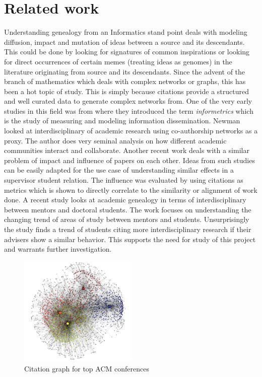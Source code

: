 \documentclass[a4paper]{article}
\begin{document}
\section{Related work}
Understanding genealogy from an Informatics stand point deals with modeling diffusion, impact and mutation of ideas between a source and its descendants. This could be done by looking for signatures of common inspirations or looking for direct occurrences of certain memes (treating ideas as genomes) in the literature originating from source and its descendants. Since the advent of the branch of mathematics which deals with complex networks or graphs, this has been a hot topic of study. This is simply because citations provide a structured and well curated data to generate complex networks from. One of the very early studies in this field was from \cite{egghe1990introduction} where they introduced the term \textit{informetrics} which is the study of measuring and modeling information dissemination. Newman \cite{newman2004coauthorship} looked at interdisciplinary of academic research using co-authorship networks as a proxy. The author does very seminal analysis on how different academic communities interact and collaborate. Another recent work \cite{dietz2007unsupervised} deals with a similar problem of impact and influence of papers on each other. Ideas from such studies can be easily adapted for the use case of understanding similar effects in a supervisor student relation. The influence was evaluated by using citations as metrics which is shown to directly correlate to the similarity or alignment of work done. A recent study \cite{sugimoto2011academic} looks at academic genealogy in terms of interdisciplinary between mentors and doctoral students. The work focuses on understanding the changing trend of areas of study between mentors and students. Unsurprisingly the study finds a trend of students citing more interdisciplinary research if their advisers show a similar behavior. This supports the need for study of this project and warrants further investigation. 

\begin{figure}
\centering
\includegraphics[width=0.5\textwidth]{Figures/DM_citation_graph.png}
\caption{\label{fig:Citation}Citation graph for top ACM conferences}
\end{figure}
\end{document}
